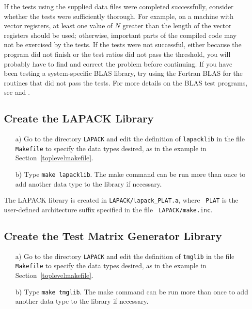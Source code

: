 If the tests using the supplied data files were completed successfully,
consider whether the tests were sufficiently thorough.
For example, on a machine with vector registers, at least one value
of $N$ greater than the length of the vector registers should be used;
otherwise, important parts of the compiled code may not be
exercised by the tests. 
If the tests were not successful, either because the program did not
finish or the test ratios did not pass the threshold, you will
probably have to find and correct the problem before continuing. 
If you have been testing a system-specific
BLAS library, try using the Fortran BLAS for the routines that
did not pass the tests.
For more details on the BLAS test programs, 
see \cite{BLAS2-test} and \cite{BLAS3-test}.

\subsection{Create the LAPACK Library}

\begin{itemize}
\item[a)]
Go to the directory {\tt LAPACK} and edit the definition of
{\tt lapacklib} in the file {\tt Makefile} to specify the data types desired,
as in the example in Section~\ref{toplevelmakefile}.

\item[b)]
Type {\tt make lapacklib}.
The make command can be run more than once to add another
data type to the library if necessary.  

\end{itemize}

\noindent
The LAPACK library is created in {\tt LAPACK/lapack\_PLAT.a}, where {\tt
PLAT} is the user-defined architecture suffix specified in the file {\tt
LAPACK/make.inc}.

\subsection{Create the Test Matrix Generator Library}

\begin{itemize}
\item[a)]
Go to the directory {\tt LAPACK} and edit the definition of {\tt tmglib}
in the file {\tt Makefile} to specify the data types desired, as in the
example in Section~\ref{toplevelmakefile}.

\item[b)]
Type {\tt make tmglib}.
The make command can be run more than once to add another
data type to the library if necessary.  

\end{itemize}

